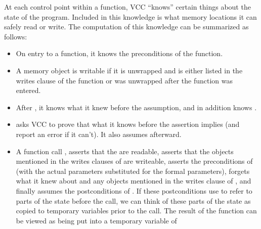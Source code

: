 {{At each control point within a function, VCC ``knows'' certain things
about the state of the program. Included in this knowledge is what
memory locations it can safely read or write. The computation of this
knowledge can be summarized as follows:
\begin{itemize}
\item
On entry to a function, it knows the preconditions of the function.
\item
A memory object is writable if it is unwrapped and is either listed in the 
writes clause of the function or was unwrapped after the function was entered.
\item
After , it knows what it knew before the assumption,
and in addition knows .
\item
{} asks VCC to prove that what it knows before the
assertion implies  (and report an error if it can't). 
It also assumes  afterward.
\item 
A function call , 
asserts that the  are readable, asserts that the objects
mentioned in the writes clauses of  are writeable,
asserts the preconditions of  (with the actual parameters
substituted for the formal parameters), forgets what it knew about
 and any objects mentioned in the writes clause of , and
finally assumes the postconditions of .
If these postconditions use \vcc{\\old} to refer to parts of
the state before the call, we can think of these parts of the state
as copied to temporary variables prior to the call. The result of
the function can be viewed as being put into a temporary variable of

\end{itemize}}}
